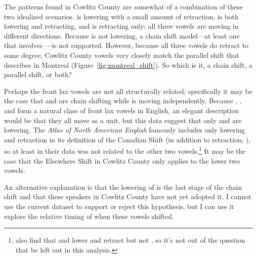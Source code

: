 The patterns found in Cowlitz County are somewhat of a combination of these two idealized scenarios. \bat is lowering with a small amount of retraction, \bet is both lowering and retracting, and \bit is retracting only; all three vowels are moving in different directions. Because \bit is not lowering, a chain shift model---at least one that involves \bit---is not supported. However, because all three vowels do retract to some degree, Cowlitz County vowels very closely match the parallel shift that \citet{boberg_2005} describes in Montreal (Figure~\ref{fig:montreal_shift}). So which is it, a chain shift, a parallel shift, or both?

Perhaps the front lax vowels are not all structurally related; specifically it may be the case that \bet and \bat are chain shifting while \bit is moving independently. Because \bit, \bet, and \bat form a natural class of front lax vowels in English, an elegant description would be that they all move as a unit, but this data suggest that only \bet and \bat are lowering. The \textit{Atlas of North American English} famously includes only \bet lowering and \bat retraction in its definition of the Canadian Shift (in addition to \lot retraction; \citealt[219]{labov_ash_boberg_2006_anae}), so at least in their data \bit was not related to the other two vowels.\footnote{\citet{donofrio_etal_2019} also find that \bat and \bet lower and retract but not \bit, so it's not out of the question that \bit be left out in this analysis.} It may be the case that the Elsewhere Shift in Cowlitz County only applies to the lower two vowels.

An alternative explanation is that the lowering of \bit is the last stage of the chain shift and that these speakers in Cowlitz County have not yet adopted it. I cannot use the current dataset to support or reject this hypothesis, but I can use it explore the relative timing of when these vowels shifted.

